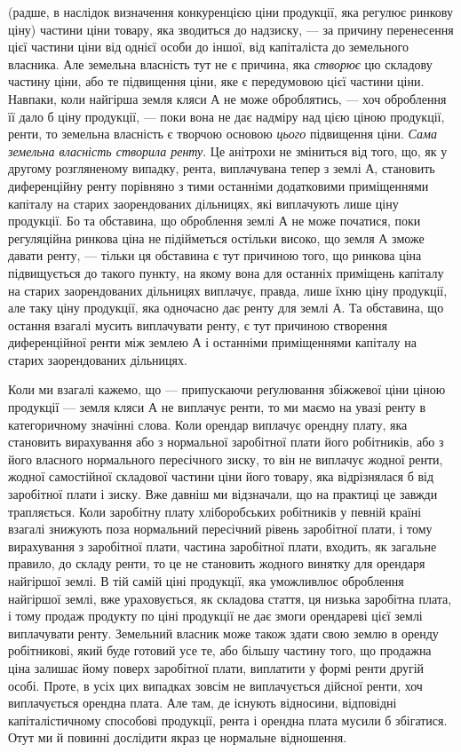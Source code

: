 \parcont{}  %
(радше, в наслідок визначення конкуренцією ціни продукції, яка регулює ринкову
ціну) частини ціни товару, яка зводиться до надзиску, — за причину перенесення
цієї частини ціни від однієї особи до іншої, від капіталіста до
земельного власника. Але земельна власність тут не є причина, яка \emph{створює}
цю складову частину ціни, або те підвищення ціни, яке є передумовою цієї
частини ціни. Навпаки, коли найгірша земля кляси $А$ не може оброблятись, —
хоч оброблення її дало б ціну продукції, — поки вона не дає надміру над цією
ціною продукції, ренти, то земельна власність є творчою основою \emph{цього} підвищення
ціни. \emph{Сама земельна власність створила ренту}. Це анітрохи не
зміниться від того, що, як у другому розгляненому випадку, рента, виплачувана
тепер з землі $А$, становить диференційну ренту порівняно з тими останніми
додатковими приміщеннями капіталу на старих заорендованих дільницях, які
виплачують лише ціну продукції. Бо та обставина, що оброблення землі $А$
не може початися, поки регуляційна ринкова ціна не підійметься остільки високо,
що земля $А$ зможе давати ренту, — тільки ця обставина є тут причиною
того, що ринкова ціна підвищується до такого пункту, на якому вона для
останніх приміщень капіталу на старих заорендованих дільницях виплачує,
правда, лише їхню ціну продукції, але таку ціну продукції, яка одночасно
дає ренту для землі $А$. Та обставина, що остання взагалі мусить виплачувати
ренту, є тут причиною створення диференційної ренти між землею $А$ і останніми
приміщеннями капіталу на старих заорендованих дільницях.

Коли ми взагалі кажемо, що — припускаючи реґулювання збіжжевої ціни
ціною продукції — земля кляси $А$ не виплачує ренти, то ми маємо на увазі
ренту в категоричному значінні слова. Коли орендар виплачує орендну плату,
яка становить вирахування або з нормальної заробітної плати його робітників,
або з його власного нормального пересічного зиску, то він не виплачує жодної
ренти, жодної самостійної складової частини ціни його товару, яка відрізнялася б
від заробітної плати і зиску. Вже давніш ми відзначали, що на практиці це
завжди трапляється. Коли заробітну плату хліборобських робітників у певній
країні взагалі знижують поза нормальний пересічний рівень заробітної плати,
і тому вирахування з заробітної плати, частина заробітної плати, входить, як
загальне правило, до складу ренти, то це не становить жодного винятку для
орендаря найгіршої землі. В тій самій ціні продукції, яка уможливлює оброблення
найгіршої землі, вже ураховується, як складова стаття, ця низька заробітна
плата, і тому продаж продукту по ціні продукції не дає змоги орендареві
цієї землі виплачувати ренту. Земельний власник може також здати свою землю
в оренду робітникові, який буде готовий усе те, або більшу частину того, що
продажна ціна залишає йому поверх заробітної плати, виплатити у формі
ренти другій особі. Проте, в усіх цих випадках зовсім не виплачується дійсної
ренти, хоч виплачується орендна плата. Але там, де існують відносини, відповідні
капіталістичному способові продукції, рента і орендна плата мусили б
збігатися. Отут ми й повинні дослідити якраз це нормальне відношення.

